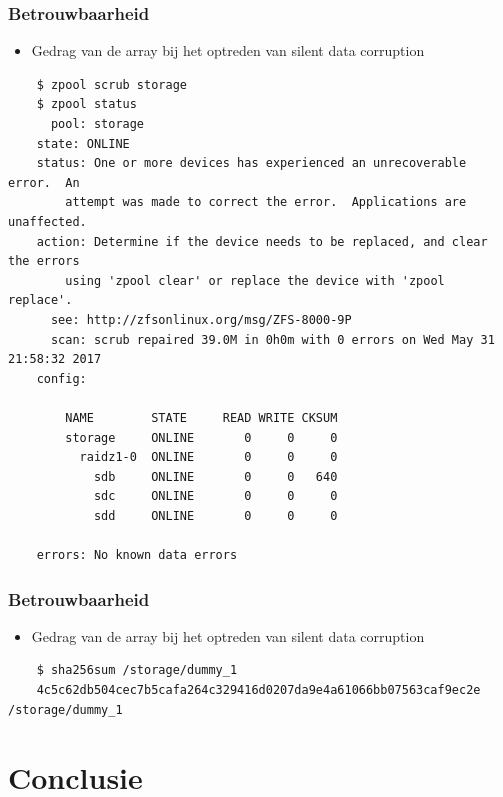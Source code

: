 \documentclass{beamer}
\begin{document}
\begin{frame}[fragile]
  \frametitle{Betrouwbaarheid}
  \begin{itemize}
    \item Gedrag van de array bij het optreden van silent data corruption
  \end{itemize}
  \begin{verbatim}
    $ zpool scrub storage
    $ zpool status 
      pool: storage
    state: ONLINE
    status: One or more devices has experienced an unrecoverable error.  An
	    attempt was made to correct the error.  Applications are unaffected.
    action: Determine if the device needs to be replaced, and clear the errors
	    using 'zpool clear' or replace the device with 'zpool replace'.
      see: http://zfsonlinux.org/msg/ZFS-8000-9P
      scan: scrub repaired 39.0M in 0h0m with 0 errors on Wed May 31 21:58:32 2017
    config:

	    NAME        STATE     READ WRITE CKSUM
	    storage     ONLINE       0     0     0
	      raidz1-0  ONLINE       0     0     0
	        sdb     ONLINE       0     0   640
	        sdc     ONLINE       0     0     0
	        sdd     ONLINE       0     0     0

    errors: No known data errors

  \end{verbatim}
\end{frame}

\begin{frame}[fragile]
  \frametitle{Betrouwbaarheid}
  \begin{itemize}
    \item Gedrag van de array bij het optreden van silent data corruption
  \end{itemize}
  \begin{verbatim}
    $ sha256sum /storage/dummy_1
    4c5c62db504cec7b5cafa264c329416d0207da9e4a61066bb07563caf9ec2e  /storage/dummy_1
  \end{verbatim}
\end{frame}


    
\section{Conclusie}
\end{document}
